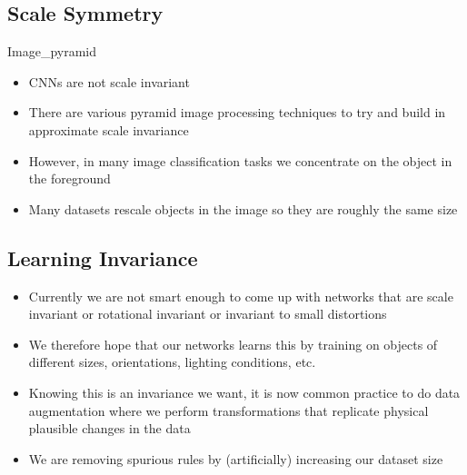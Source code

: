 
\begin{slide}
\section{Scale Symmetry}

\begin{PauseHighLight}
  \begin{rightImage}[0.35]{Image_pyramid}
  \begin{itemize}
  \item CNNs are not scale invariant\pause
  \item There are various pyramid image processing techniques to try
    and build in approximate scale invariance\pause
  \item However, in many image classification tasks we concentrate on
    the object in the foreground\pauseb
  \item Many datasets rescale objects in the image so
    they are roughly the same size\pauseb
  \end{itemize}
  \end{rightImage}
\end{PauseHighLight}

\end{slide}


\begin{slide}
\section{Learning Invariance}

\begin{PauseHighLight}
  \begin{itemize}
  \item Currently we are  not smart enough to come up with networks
    that are scale invariant or rotational invariant\pause{} or
    invariant to small distortions\pauseb
  \item We therefore hope that our networks learns this by training on
    objects of different sizes, orientations, lighting conditions,
    etc.\pause
  \item Knowing this is an invariance we want, it is now common
    practice to do data augmentation where we perform transformations
    that replicate physical plausible changes in the data\pause
  \item We are removing spurious rules by (artificially) increasing
    our dataset size\pause
  \end{itemize}
\end{PauseHighLight}

\end{slide}

